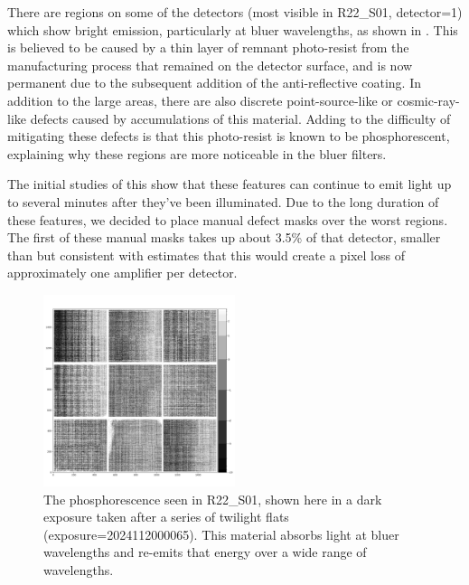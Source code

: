 There are regions on some of the detectors (most visible in R22\_S01, detector=1) which show bright emission, particularly at bluer wavelengths, as shown in .
This is believed to be caused by a thin layer of remnant photo-resist from the manufacturing process that remained on the detector surface, and is now permanent due to the subsequent addition of the anti-reflective coating.
In addition to the large areas, there are also discrete point-source-like or cosmic-ray-like defects caused by accumulations of this material.
Adding to the difficulty of mitigating these defects is that this photo-resist is known to be phosphorescent, explaining why these regions are more noticeable in the bluer filters.

The initial studies of this show that these features can continue to emit light up to several minutes after they've been illuminated.
Due to the long duration of these features, we decided to place manual defect masks over the worst regions.
The first of these manual masks takes up about 3.5\% of that detector, smaller than but consistent with
estimates that this would create a pixel loss of approximately one amplifier per detector.

\begin{figure}
  \begin{center}
  \includegraphics[width=0.5\textwidth]{figures/isr-f01-phosphor_dark_exposure.jpg}
  \caption{The phosphorescence seen in R22\_S01, shown here in a dark exposure taken after a series of twilight flats (exposure=2024112000065).  This material absorbs light at bluer wavelengths and re-emits that energy over a wide range of wavelengths.}
  \label{fig:isr_phosphorescence_example}
  \end{center}
\end{figure}

